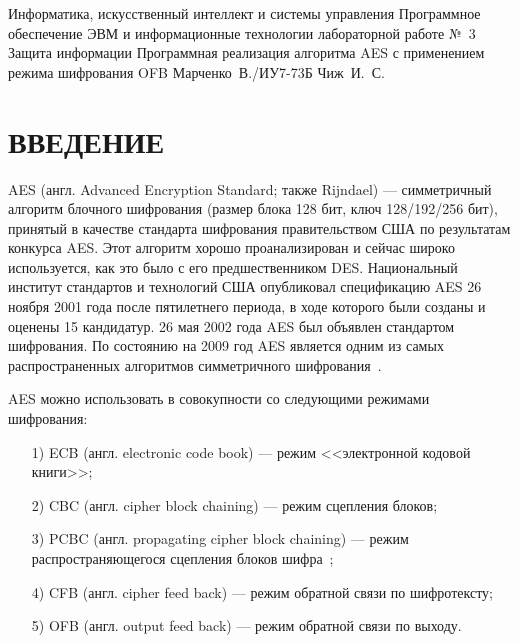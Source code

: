 \documentclass{bmstu}
\begin{document}
\makereporttitle
    {Информатика, искусственный интеллект и системы управления} %
    {Программное обеспечение ЭВМ и информационные технологии} %
    {лабораторной работе №~3} %
    {Защита информации} %
    {Программная реализация алгоритма AES с применением режима шифрования OFB} %
    {} %
    {Марченко~В./ИУ7-73Б} %
    {Чиж~И.~С.} %

{\centering \maketableofcontents}

{\centering \chapter*{ВВЕДЕНИЕ}}

AES (англ. Advanced Encryption Standard; также Rijndael) --- симметричный алгоритм блочного шифрования (размер блока 128 бит, ключ 128/192/256 бит), принятый в качестве стандарта шифрования правительством США по результатам конкурса AES. 
Этот алгоритм хорошо проанализирован и сейчас широко используется, как это было с его предшественником DES. 
Национальный институт стандартов и технологий США опубликовал спецификацию AES 26 ноября 2001 года после пятилетнего периода, в ходе которого были созданы и оценены 15 кандидатур. 
26 мая 2002 года AES был объявлен стандартом шифрования. По состоянию на 2009 год AES является одним из самых распространенных алгоритмов симметричного шифрования~\cite{wiki-aes}.

AES можно использовать в совокупности со следующими режимами шифрования:
\begin{enumerate}
\item[1)] ECB (англ. electronic code book) --- режим <<электронной кодовой книги>>;
\item[2)] CBC (англ. cipher block chaining) --- режим сцепления блоков;
\item[3)] PCBC (англ. propagating cipher block chaining) --- режим распространяющегося сцепления блоков шифра~\cite{wiki-ofb};
\item[4)] CFB (англ. cipher feed back) --- режим обратной связи по шифротексту;
\item[5)] OFB (англ. output feed back) --- режим обратной связи по выходу.
\end{enumerate}
\end{document}
